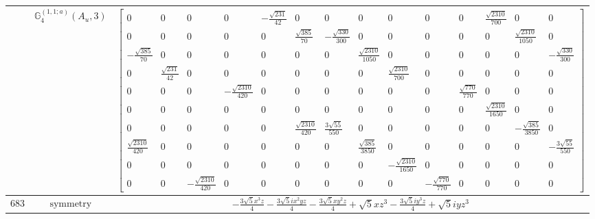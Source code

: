 \documentclass[fleqn,8pt,landscape]{jsarticle}
\begin{document}
\begin{longtable}{ccc}
$  $ & $ \mathbb{G}_{4}^{(1,1;a)}(A_{u},3) $ & $ \begin{bmatrix} 0 & 0 & 0 & 0 & - \frac{\sqrt{231}}{42} & 0 & 0 & 0 & 0 & 0 & 0 & \frac{\sqrt{2310}}{700} & 0 & 0 \\ 0 & 0 & 0 & 0 & 0 & \frac{\sqrt{385}}{70} & - \frac{\sqrt{330}}{300} & 0 & 0 & 0 & 0 & 0 & \frac{\sqrt{2310}}{1050} & 0 \\ - \frac{\sqrt{385}}{70} & 0 & 0 & 0 & 0 & 0 & 0 & \frac{\sqrt{2310}}{1050} & 0 & 0 & 0 & 0 & 0 & - \frac{\sqrt{330}}{300} \\ 0 & \frac{\sqrt{231}}{42} & 0 & 0 & 0 & 0 & 0 & 0 & \frac{\sqrt{2310}}{700} & 0 & 0 & 0 & 0 & 0 \\ 0 & 0 & 0 & - \frac{\sqrt{2310}}{420} & 0 & 0 & 0 & 0 & 0 & 0 & \frac{\sqrt{770}}{770} & 0 & 0 & 0 \\ 0 & 0 & 0 & 0 & 0 & 0 & 0 & 0 & 0 & 0 & 0 & \frac{\sqrt{2310}}{1650} & 0 & 0 \\ 0 & 0 & 0 & 0 & 0 & \frac{\sqrt{2310}}{420} & \frac{3 \sqrt{55}}{550} & 0 & 0 & 0 & 0 & 0 & - \frac{\sqrt{385}}{3850} & 0 \\ \frac{\sqrt{2310}}{420} & 0 & 0 & 0 & 0 & 0 & 0 & \frac{\sqrt{385}}{3850} & 0 & 0 & 0 & 0 & 0 & - \frac{3 \sqrt{55}}{550} \\ 0 & 0 & 0 & 0 & 0 & 0 & 0 & 0 & - \frac{\sqrt{2310}}{1650} & 0 & 0 & 0 & 0 & 0 \\ 0 & 0 & - \frac{\sqrt{2310}}{420} & 0 & 0 & 0 & 0 & 0 & 0 & - \frac{\sqrt{770}}{770} & 0 & 0 & 0 & 0 \end{bmatrix} $ \\ \hline
$ 683 $ & $ \text{symmetry} $ & $ - \frac{3 \sqrt{5} x^{3} z}{4} - \frac{3 \sqrt{5} i x^{2} y z}{4} - \frac{3 \sqrt{5} x y^{2} z}{4} + \sqrt{5} x z^{3} - \frac{3 \sqrt{5} i y^{3} z}{4} + \sqrt{5} i y z^{3} $ \\

\end{longtable}
\end{document}

